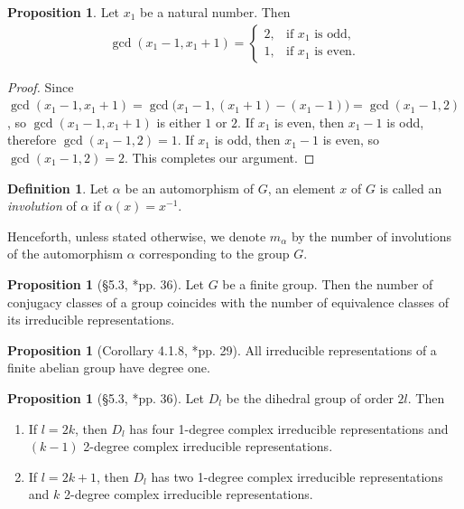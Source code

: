 \documentclass{amsart}
\theoremstyle{definition}
\newtheorem{definition}[theorem]{Definition}
\newtheorem{proposition}[theorem]{Proposition}
\theoremstyle{remark}
\numberwithin{equation}{section}
\begin{document}
    \begin{proposition}\label{gcd_secondary_supporting_result}
        Let $x_1$ be a natural number. Then
        \begin{align*}
            \gcd(x_1-1,x_1+1)=
            \begin{cases}
                2, & \text{if $x_1$ is odd},\\[4pt]
                1, & \text{if $x_1$ is even}.
            \end{cases}
        \end{align*}
    \end{proposition}
    \begin{proof}
        Since $\gcd(x_1-1,x_1+1)=\gcd\bigl(x_1-1,(x_1+1)-(x_1-1)\bigr)=\gcd(x_1-1,2)$, so $\gcd(x_1-1,x_1+1)$ is either $1$ or $2$. If $x_1$ is even, then $x_1 - 1$ is odd, therefore $\gcd(x_1-1,2) = 1$. If $x_1$ is odd, then $x_1-1$ is even, so $\gcd(x_1 - 1, 2) = 2$. This completes our argument.
    \end{proof}
    \begin{definition}
        Let $\alpha$ be an automorphism of $G$, an element $x$ of $G$ is called an \emph{involution} of $\alpha$ if $\alpha(x) = x^{-1}$.
    \end{definition}
    Henceforth, unless stated otherwise, we denote $m_{\alpha}$ by the number of involutions of the automorphism $\alpha$ corresponding to the group $G$. 
    \begin{proposition}[\S 5.3, \cite{MR450380}*{pp. 36}]\label{number_of_irrep_equals_conjugacy_classes}
        Let $G$ be a finite group. Then the number of conjugacy classes of a group coincides with the number of equivalence classes of its irreducible representations.
    \end{proposition}
    \begin{proposition}[Corollary 4.1.8, \cite{MR2867444}*{pp. 29}]\label{sum_of_irreducibles_of_abelian_group}
        All irreducible representations of a finite abelian group have degree one.
    \end{proposition}
    \begin{proposition}[\S 5.3, \cite{MR450380}*{pp. 36}]\label{degrres_irr_of_dn}
        Let $D_l$ be the dihedral group of order $2l$. Then 
        \begin{enumerate}
            \item If $l = 2k$, then $D_l$ has four 1-degree complex irreducible representations and $(k - 1)$ 2-degree complex irreducible representations.
            \item If $l = 2k + 1$, then $D_l$ has two 1-degree complex irreducible representations and $k$ 2-degree complex irreducible representations.
        \end{enumerate}
    \end{proposition}
\end{document}
